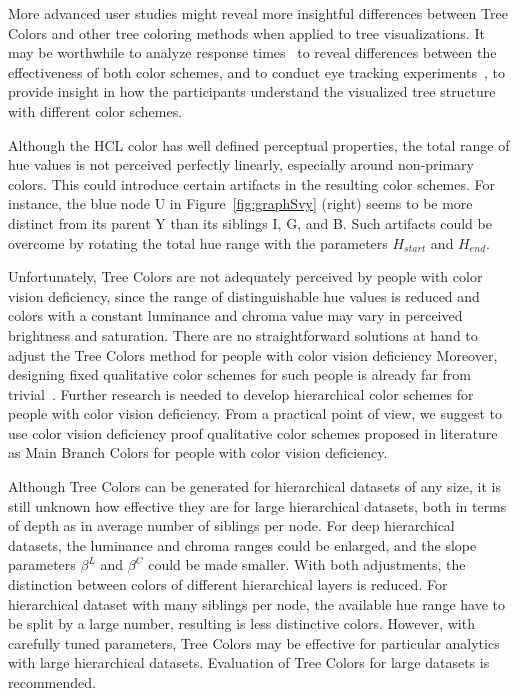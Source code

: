 \documentclass[journal]{vgtc}                %
\begin{document}

More advanced user studies might reveal more insightful differences between Tree Colors and other tree coloring methods when applied to tree visualizations. 
It may be worthwhile to analyze response times~\cite{wang06} to reveal differences between the effectiveness of both color schemes, and to conduct eye tracking experiments~\cite{burch11}, to provide insight in how the participants understand the visualized tree structure with different color schemes.

Although the HCL color has well defined perceptual properties, the total range of hue values is not perceived perfectly linearly, especially around non-primary colors. This could introduce certain artifacts in the resulting color schemes. For instance, the blue node U in Figure~\ref{fig:graphSvy} (right) seems to be more distinct from its parent Y than its siblings I, G, and B. Such artifacts could be overcome by rotating the total hue range with the parameters $H_{start}$ and $H_{end}$.

Unfortunately, Tree Colors are not adequately perceived by people with color vision deficiency, since the range of distinguishable hue values is reduced and colors with a constant luminance and chroma value may vary in perceived brightness and saturation. There are no straightforward solutions at hand to adjust the Tree Colors method for people with color vision deficiency Moreover, designing fixed qualitative color schemes for such people is already far from trivial~\cite{okabe02}. Further research is needed to develop hierarchical color schemes for people with color vision deficiency. From a practical point of view, we suggest to use color vision deficiency proof qualitative color schemes proposed in literature~\cite{okabe02, brewer03} as Main Branch Colors for people with color vision deficiency.

Although Tree Colors can be generated for hierarchical datasets of any size, it is still unknown how effective they are for large hierarchical datasets, both in terms of depth as in average number of siblings per node. For deep hierarchical datasets, the luminance and chroma ranges could be enlarged, and the slope parameters $\beta^{L}$ and $\beta^{C}$ could be made smaller. With both adjustments, the distinction between colors of different hierarchical layers is reduced. For hierarchical dataset with many siblings per node, the available hue range have to be split by a large number, resulting is less distinctive colors. However, with carefully tuned parameters, Tree Colors may be effective for particular analytics with large hierarchical datasets. Evaluation of Tree Colors for large datasets is recommended.
\end{document}
